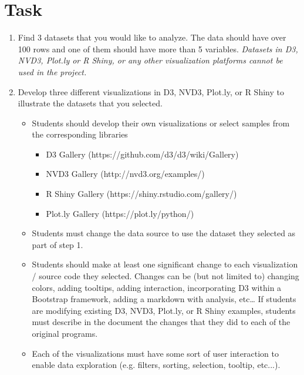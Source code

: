 \documentclass{article}
\begin{document}
\section{Task}
\begin{enumerate}
    \item Find 3 datasets that you would like to analyze.  The data should have over 100 rows and one of them should have more than 5 variables. \textit{Datasets in D3, NVD3, Plot.ly or R Shiny, or any other visualization platforms cannot be used in the project.}
    \item Develop three different visualizations in D3, NVD3, Plot.ly, or R Shiny to illustrate the datasets that you selected.

    \begin{itemize}
        \item Students should develop their own visualizations or select samples from the corresponding libraries

        \begin{itemize}
            \item D3 Gallery (https://github.com/d3/d3/wiki/Gallery)
            \item NVD3 Gallery (http://nvd3.org/examples/)
            \item R Shiny Gallery (https://shiny.rstudio.com/gallery/)
            \item Plot.ly Gallery (https://plot.ly/python/)
        \end{itemize}

        \item Students must change the data source to use the dataset they selected as part of step 1.

        \item Students should make at least one significant change to each visualization / source code they selected. Changes can be (but not limited to) changing colors, adding tooltips, adding interaction, incorporating D3 within a Bootstrap framework, adding a markdown with analysis, etc… If students are modifying existing D3, NVD3, Plot.ly, or R Shiny examples, students must describe in the document the changes that they did to each of the original programs.

        \item Each of the visualizations must have some sort of user interaction to enable data exploration (e.g. filters, sorting, selection, tooltip, etc...).

    \end{itemize}


\end{enumerate}
\end{document}
